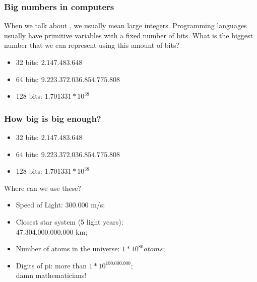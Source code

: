 \documentclass{beamer}
\begin{document}
\begin{frame}
  \frametitle{Big numbers in computers}
  \begin{block}{}
    When we talk about , we usually mean large
    integers. Programming languages usually have primitive variables
    with a fixed number of bits. What is the biggest number that we
    can represent using this amount of bits?
  \end{block}
  
  \bigskip

  \begin{itemize}
    \item 32 bits: $2.147.483.648$
    \item 64 bits: $9.223.372.036.854.775.808$
    \item 128 bits: $1.701331*10^{38}$
  \end{itemize}
\end{frame}

\begin{frame}
  \frametitle{How big is big enough?}

    \begin{itemize}
    \item 32 bits: $2.147.483.648$
    \item 64 bits: $9.223.372.036.854.775.808$
    \item 128 bits: $1.701331*10^{38}$
    \end{itemize}

    \begin{block}{Where can we use these?}
    \end{block}
    
    \begin{itemize}
    \item Speed of Light: 300.000 m/s;
    \item<2-> Closest star system (5 light years):\\ $47.304.000.000.000$ km; 
    \item<3-> Number of atoms in the universe: $1*10^{80} atoms$;
    \item<4-> Digits of pi: more than $1*10^{100.000.000}$;\\
      \alert{damn mathematicians!}
    \end{itemize}    
\end{frame}
\end{document}

